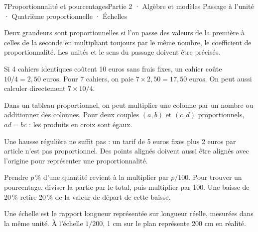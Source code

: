 \begin{ouverture}[courbe]{7}{Proportionnalité et pourcentages}{Partie 2 · Algèbre et modèles}
{Passage à l’unité · Quatrième proportionnelle · Échelles}
\end{ouverture}
\pagestyle{otMain}\essentiel\fontsize{11}{15}\selectfont
{}\label{cours-7-1}
\begin{definition}Deux grandeurs sont proportionnelles si l’on passe des valeurs de la première à celles de la seconde en multipliant toujours par le même nombre, le coefficient de proportionnalité. Les unités et le sens du passage doivent être précisés.\end{definition}
\begin{exemple}Si 4 cahiers identiques coûtent 10 euros sans frais fixes, un cahier coûte $10/4=2{,}50$ euros. Pour 7 cahiers, on paie $7\times2{,}50=17{,}50$ euros. On peut aussi calculer directement $7\times10/4$.\end{exemple}
\begin{propriete}Dans un tableau proportionnel, on peut multiplier une colonne par un nombre ou additionner des colonnes. Pour deux couples $(a,b)$ et $(c,d)$ proportionnels, $ad=bc$ : les produits en croix sont égaux.\end{propriete}
\begin{attention}Une hausse régulière ne suffit pas : un tarif de 5 euros fixes plus 2 euros par article n’est pas proportionnel. Des points alignés doivent aussi être alignés avec l’origine pour représenter une proportionnalité.\end{attention}
\clearpage
{}\label{cours-7-2}
\begin{propriete}Prendre $p\,\%$ d’une quantité revient à la multiplier par $p/100$. Pour trouver un pourcentage, diviser la partie par le total, puis multiplier par 100. Une baisse de 20\,\% retire 20\,\% de la valeur de départ de cette baisse.\end{propriete}
\begin{definition}Une échelle est le rapport longueur représentée sur longueur réelle, mesurées dans la même unité. À l’échelle $1/200$, 1 cm sur le plan représente 200 cm en réalité.\end{definition}
